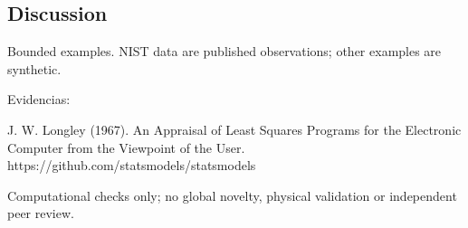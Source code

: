 \documentclass{article}
\begin{document}
\subsection*{Discussion}
Bounded examples. NIST data are published observations; other examples are synthetic.\par
Evidencias: \par
[ref\_9461a7201cac9c1b4e5b5bb0] J. W. Longley (1967). An Appraisal of Least Squares Programs for the Electronic Computer from the Viewpoint of the User. https://github.com/statsmodels/statsmodels\par
Computational checks only; no global novelty, physical validation or independent peer review.
\end{document}
